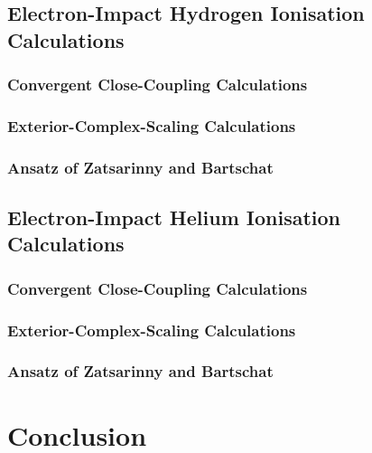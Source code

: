 \documentclass[draft]{article}
\begin{document}
\subsection{Electron-Impact Hydrogen Ionisation Calculations}
\label{sec:e-h-ionisation-calculations}

\subsubsection{Convergent Close-Coupling Calculations}
\label{sec:e-h-ccc-calculations}

\subsubsection{Exterior-Complex-Scaling Calculations}
\label{sec:e-h-ecs-calculations}

\subsubsection{Ansatz of Zatsarinny and Bartschat}
\label{sec:e-h-ecs-calculations}

\subsection{Electron-Impact Helium Ionisation Calculations}
\label{sec:e-he-ionisation-calculations}

\subsubsection{Convergent Close-Coupling Calculations}
\label{sec:e-he-ccc-calculations}

\subsubsection{Exterior-Complex-Scaling Calculations}
\label{sec:e-he-ecs-calculations}

\subsubsection{Ansatz of Zatsarinny and Bartschat}
\label{sec:e-he-ecs-calculations}

\section{Conclusion}
\label{sec:conclusion}

\clearpage
\end{document}
